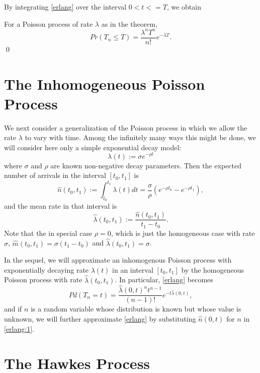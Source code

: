 \documentclass[12pt,leqno]{article}
\begin{document}
By integrating \eqref{erlang} over the interval $0<t<=T$, we obtain
\begin{Cor}
  For a Poisson process of rate $\lambda$ as in the theorem, 
  \begin{equation}\label{poisson}
  Pr(T_n \le T) = \frac{\lambda^nT^{n}}{n!}e^{-\lambda{T}}.
  \end{equation}
  \qed
\end{Cor}

\section{The Inhomogeneous Poisson Process}
We next consider a generalization of the Poisson process in which we allow the rate $\lambda$ to vary with time.
Among the infinitely many ways this might be done, we will consider here only a simple exponential decay model:
\begin{equation}\label{exp_rate}
  \lambda(t) := {\sigma}e^{-\rho{t}}
\end{equation}
where $\sigma$ and $\rho$ are known non-negative decay parameters.
Then the expected number of arrivals in the interval $[t_0,t_1]$ is
\begin{equation}\label{n_hat}
  \hat{n}(t_0,t_1) := \int_{t_0}^{t_1}\lambda(t)dt = \frac{\sigma}{\rho}(e^{-\rho{t_0}}- e^{-\rho{t_1}}),
\end{equation}
and the mean rate in that interval is
\begin{equation}\label{lambda_hat}
  \hat{\lambda}(t_0,t_1) := \frac{\hat{n}(t_0,t_1)}{t_1 - t_0}.
\end{equation}
Note that the in special case $\rho = 0$, which is just the homogeneous case with rate $\sigma$,
$\hat{m}(t_0,t_1) = \sigma(t_1-t_0)$ and $\hat{\lambda}(t_0,t_1) = \sigma$.

In the sequel, we will approximate an inhomogenous Poisson process with exponentially decaying rate $\lambda(t)$
in an interval $[t_0,t_1]$ by the homogeneous Poisson process with rate $\hat{\lambda}(t_0,t_1)$.  In particular,
\eqref{erlang} becomes
\begin{equation}\label{erlang:1}
  Pd(T_n = t) = \frac{\hat{\lambda}(0,t)^nt^{n-1}}{(n-1)!}e^{-t\hat{\lambda}(0,t)},
\end{equation}
and if $n$ is a random variable whose distribution is known but whose value is unknown, we will further approximate
\eqref{erlang} by substituting $\hat{n}(0,t)$ for $n$ in \eqref{erlang:1}.


\section{The Hawkes Process}
\end{document}
